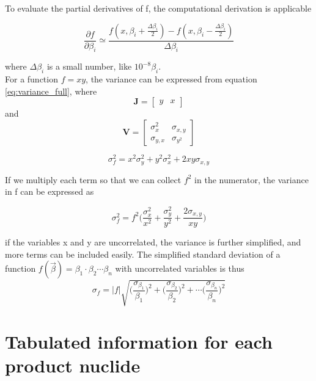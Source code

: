 \documentclass[a4paper,11pt,twoside]{book}
\begin{document}
\noindent To evaluate the partial derivatives of f, the computational derivation is applicable

\begin{equation}
    \frac{\partial f}{\partial \beta_i} \simeq\frac{f(x, \beta_i + \frac{\Delta \beta_i}{2}) - f(x, \beta_i-\frac{\Delta \beta_i}{2})}{\Delta \beta_i}
\end{equation}

\noindent where $\Delta\beta_i$ is a small number, like $10^{-8}\beta_i$. \\


\noindent 
For a function $f=xy $, the variance can be expressed from equation \ref{eq:variance_full}, where  $$\mathbf{J}=\begin{bmatrix}y & x \end{bmatrix}$$ and $$\mathbf{V}=\begin{bmatrix} \sigma_x^2 & \sigma_{x,y}\\\sigma_{y,x} & \sigma_{y^2} \end{bmatrix}$$ 

\begin{equation}
    \sigma_f^2 = x^2\sigma_y^2 + y^2\sigma_x^2 + 2 xy \sigma_{x,y}
\end{equation}

\noindent If we multiply each term so that we can collect $f^2$ in the numerator, the variance in f can be expressed as 

\begin{equation}
    \sigma_f^2 = f^2 \big( \frac{\sigma_x^2}{x^2} + \frac{\sigma_y^2}{y^2} + \frac{2\sigma_{x,y}}{xy} \Big)
\end{equation}

\noindent if the variables x and y are uncorrelated, the variance is further simplified, and more terms can be included easily. The simplified standard deviation of a function $f(\vec{\beta})=\beta_1 \cdot \beta_2 \cdots \beta_n $ with uncorrelated variables is thus
\begin{equation} \label{eq:uncertainty_simplification}
    \sigma_f = |f|\sqrt{ \Big( \frac{\sigma_{\beta_1}}{\beta_1}\Big)^2 +  \Big( \frac{\sigma_{\beta_2}}{\beta_2}\Big)^2 + \cdots  \Big( \frac{\sigma_{\beta_n}}{\beta_n}\Big)^2    } 
\end{equation}



\chapter{Tabulated information for each product nuclide}
\end{document}

